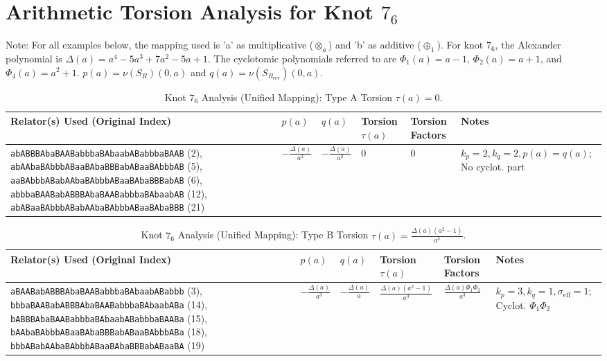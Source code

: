 \documentclass{article}
\begin{document}
\vspace{1cm}

\section*{Arithmetic Torsion Analysis for Knot $7_6$}

\noindent Note: For all examples below, the mapping used is 'a' as multiplicative ($\otimes_a$) and 'b' as additive ($\oplus_1$).
For knot $7_6$, the Alexander polynomial is $\Delta(a) = a^4 - 5a^3 + 7a^2 - 5a + 1$.
The cyclotomic polynomials referred to are $\Phi_1(a) = a-1$, $\Phi_2(a) = a+1$, and $\Phi_4(a) = a^2+1$.
$p(a) = \nu(S_R)(0,a)$ and $q(a) = \nu(S_{R_{\text{rev}}})(0,a)$.

\begin{table}[htbp]
\centering
\caption{Knot $7_6$ Analysis (Unified Mapping): Type A Torsion $\tau(a) = 0$.}
\label{tab:knot76_type_A}
\scriptsize
\begin{tabular}{@{}p{4.0cm} p{1.8cm} p{1.8cm} p{2.2cm} p{3.0cm} p{3.2cm}@{}}
\toprule
\textbf{Relator(s) Used (Original Index)} & \textbf{$p(a)$} & \textbf{$q(a)$} & \textbf{Torsion $\tau(a)$} & \textbf{Torsion Factors} & \textbf{Notes} \\
\midrule
\texttt{abABBBAbaBAABabbbaBAbaabABabbbaBAAB} (2), \texttt{abAAbaBAbbbABaaBAbaBBBabABaaBAbbbAB} (5), \texttt{aaBAbbbABabAAbaBAbbbABaaBAbaBBBabAB} (6), \texttt{abbbaBAABabABBBAbaBAABabbbaBAbaabAB} (12), \texttt{abABaaBAbbbABabAAbaBAbbbABaaBAbaBBB} (21)
& $-\frac{\Delta(a)}{a^2}$ & $-\frac{\Delta(a)}{a^2}$ & $0$ & $0$ & $k_p=2, k_q=2, p(a)=q(a)$; No cyclot. part \\
\bottomrule
\end{tabular}
\end{table}

\begin{table}[htbp]
\centering
\caption{Knot $7_6$ Analysis (Unified Mapping): Type B Torsion $\tau(a) = \frac{\Delta(a)(a^2-1)}{a^3}$.}
\label{tab:knot76_type_B}
\scriptsize
\begin{tabular}{@{}p{4.0cm} p{1.8cm} p{1.8cm} p{2.2cm} p{3.0cm} p{3.2cm}@{}}
\toprule
\textbf{Relator(s) Used (Original Index)} & \textbf{$p(a)$} & \textbf{$q(a)$} & \textbf{Torsion $\tau(a)$} & \textbf{Torsion Factors} & \textbf{Notes} \\
\midrule
\texttt{aBAABabABBBAbaBAABabbbaBAbaabABabbb} (3), \texttt{bbbaBAABabABBBAbaBAABabbbaBAbaabABa} (14), \texttt{bABBBAbaBAABabbbaBAbaabABabbbaBAABa} (15), \texttt{bAAbaBAbbbABaaBAbaBBBabABaaBAbbbABa} (18), \texttt{bbbABabAAbaBAbbbABaaBAbaBBBabABaaBA} (19)
& $-\frac{\Delta(a)}{a^3}$ & $-\frac{\Delta(a)}{a}$ & $\frac{\Delta(a)(a^2-1)}{a^3}$ & $\frac{\Delta(a)\Phi_1\Phi_2}{a^3}$ & $k_p=3, k_q=1, \sigma_{\text{eff}}=1$; Cyclot. $\Phi_1\Phi_2$ \\
\bottomrule
\end{tabular}
\end{table}
\end{document}
